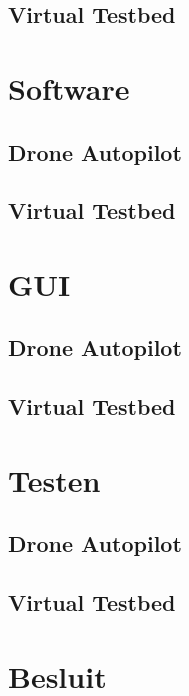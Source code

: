 \documentclass[eind]{penoverslag}
\begin{document}
\subsection{Virtual Testbed}
%


\section{Software}
\label{sec:Software}
%


\subsection{Drone Autopilot}
%


\subsection{Virtual Testbed}
%

\section{GUI}
\label{sec:GUI}
%


\subsection{Drone Autopilot}
%


\subsection{Virtual Testbed}
%


\section{Testen}
\label{sec:Testen}
%


\subsection{Drone Autopilot}
%


\subsection{Virtual Testbed}
%

\section*{Besluit}
\label{sec:Besluit}
%







%
\end{document}

